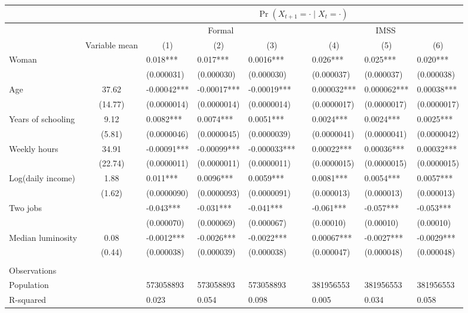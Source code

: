 \begin{tabular}{lclllrlll}
\midrule
      &       & \multicolumn{7}{c}{$\Pr(X_{t+1} = \cdot \;|\; X_{t} = \cdot)$} \\
\midrule
      &       & \multicolumn{3}{c}{Formal} &       & \multicolumn{3}{c}{IMSS} \\
\cmidrule{3-5}\cmidrule{7-9}      & Variable mean & \multicolumn{1}{c}{(1)} & \multicolumn{1}{c}{(2)} & \multicolumn{1}{c}{(3)} &       & \multicolumn{1}{c}{(4)} & \multicolumn{1}{c}{(5)} & \multicolumn{1}{c}{(6)} \\
\midrule
\midrule
Woman &       & 0.018*** & 0.017*** & 0.0016*** &       & 0.026*** & 0.025*** & 0.020*** \\
      &       & (0.000031) & (0.000030) & (0.000030) &       & (0.000037) & (0.000037) & (0.000038) \\
Age   & 37.62 & -0.00042*** & -0.00017*** & -0.00019*** &       & 0.000032*** & 0.000062*** & 0.00038*** \\
      & (14.77) & (0.0000014) & (0.0000014) & (0.0000014) &       & (0.0000017) & (0.0000017) & (0.0000017) \\
Years of schooling & 9.12  & 0.0082*** & 0.0074*** & 0.0051*** &       & 0.0024*** & 0.0024*** & 0.0025*** \\
      & (5.81) & (0.0000046) & (0.0000045) & (0.0000039) &       & (0.0000041) & (0.0000041) & (0.0000042) \\
Weekly hours & 34.91 & -0.00091*** & -0.00099*** & -0.000033*** &       & 0.00022*** & 0.00036*** & 0.00032*** \\
      & (22.74) & (0.0000011) & (0.0000011) & (0.0000011) &       & (0.0000015) & (0.0000015) & (0.0000015) \\
Log(daily income) & 1.88  & 0.011*** & 0.0096*** & 0.0059*** &       & 0.0081*** & 0.0054*** & 0.0057*** \\
      & (1.62) & (0.0000090) & (0.0000093) & (0.0000091) &       & (0.000013) & (0.000013) & (0.000013) \\
Two jobs &       & -0.043*** & -0.031*** & -0.041*** &       & -0.061*** & -0.057*** & -0.053*** \\
      &       & (0.000070) & (0.000069) & (0.000067) &       & (0.00010) & (0.00010) & (0.00010) \\
Median luminosity & 0.08  & -0.0012*** & -0.0026*** & -0.0022*** &       & 0.00067*** & -0.0027*** & -0.0029*** \\
      & (0.44) & (0.000038) & (0.000039) & (0.000038) &       & (0.000047) & (0.000048) & (0.000048) \\
      &       &       &       &       &       &       &       &  \\
\midrule
Observations &       &       &       &       &       &       &       &  \\
Population &       & 573058893 & 573058893 & 573058893 &       & 381956553 & 381956553 & 381956553 \\
R-squared &       & 0.023 & 0.054 & 0.098 &       & 0.005 & 0.034 & 0.058 \\
\bottomrule
\bottomrule
\end{tabular}%
